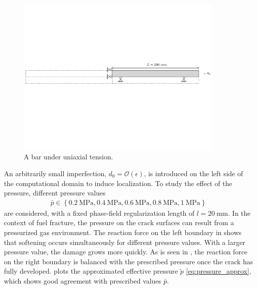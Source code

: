 \begin{figure}[!ht]
  \centering
  \includegraphics[width=0.9\textwidth,trim={0 8cm 0 8cm},clip]{Chapter3/figures/bar}
  \caption{A bar under uniaxial tension.}
  \label{fig:bar}
\end{figure}

An arbitrarily small imperfection, $d_0 = \mathcal{O}(\epsilon)$, is introduced on the left side of the computational domain to induce localization.
To study the effect of the pressure, different pressure values
\begin{align*}
  \bar{p} \in \left\{ \SI{0.2}{\mega\pascal}, \SI{0.4}{\mega\pascal}, \SI{0.6}{\mega\pascal}, \SI{0.8}{\mega\pascal}, \SI{1}{\mega\pascal} \right\}
\end{align*}
are considered, with a fixed phase-field regularization length of $l = \SI{20}{\milli\meter}$. In the context of fuel fracture, the pressure on the crack surfaces can result from a pressurized gas environment. The reaction force on the left boundary in  shows that softening occurs simultaneously for different pressure values. With a larger pressure value, the damage grows more quickly.
As is seen in , the reaction force on the right boundary is balanced with the prescribed pressure once the crack has fully developed.  plots the approximated effective pressure $\widetilde{p}$ \eqref{eq:pressure_approx}, which shows good agreement with prescribed values $\bar{p}$.

